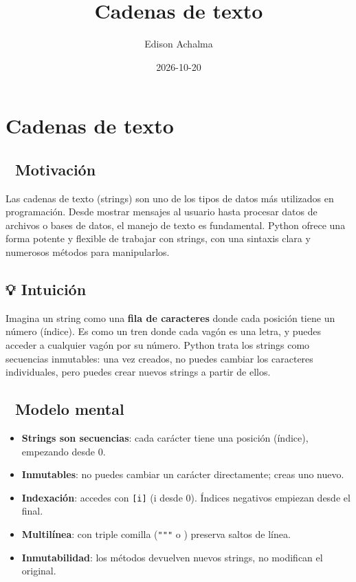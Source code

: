 \documentclass[
  doc,
  floatsintext,
  longtable,
  a4paper,
  nolmodern,
  notxfonts,
  notimes,
  12pt,
  colorlinks=true,linkcolor=blue,citecolor=blue,urlcolor=blue]{apa7}
\title{Cadenas de texto}
\author{Edison Achalma}
\affiliation{
{Escuela Profesional de Economía, Universidad Nacional de San Cristóbal
de Huamanga}}
\date{2026-10-20}
\providecommand{\tightlist}{%
  \setlength{\itemsep}{0pt}\setlength{\parskip}{0pt}}
\begin{document}
\maketitle


\hypertarget{toc}{}
\tableofcontents
\newpage
\section[Introduction]{Cadenas de texto}

\setcounter{secnumdepth}{3}

\setlength\LTleft{0pt}




\subsection{🎯 Motivación}\label{motivaciuxf3n}

Las cadenas de texto (strings) son uno de los tipos de datos más
utilizados en programación. Desde mostrar mensajes al usuario hasta
procesar datos de archivos o bases de datos, el manejo de texto es
fundamental. Python ofrece una forma potente y flexible de trabajar con
strings, con una sintaxis clara y numerosos métodos para manipularlos.

\subsection{💡 Intuición}\label{intuiciuxf3n}

Imagina un string como una \textbf{fila de caracteres} donde cada
posición tiene un número (índice). Es como un tren donde cada vagón es
una letra, y puedes acceder a cualquier vagón por su número. Python
trata los strings como secuencias inmutables: una vez creados, no puedes
cambiar los caracteres individuales, pero puedes crear nuevos strings a
partir de ellos.

\subsection{🧠 Modelo mental}\label{modelo-mental}

\begin{itemize}
\tightlist
\item
  \textbf{Strings son secuencias}: cada carácter tiene una posición
  (índice), empezando desde 0.
\item
  \textbf{Inmutables}: no puedes cambiar un carácter directamente; creas
  uno nuevo.
\item
  \textbf{Indexación}: accedes con \texttt{{[}i{]}} (i desde 0). Índices
  negativos empiezan desde el final.
\item
  \textbf{Multilínea}: con triple comilla (\texttt{"""} o
  \texttt{\textquotesingle{}\textquotesingle{}\textquotesingle{}})
  preserva saltos de línea.
\item
  \textbf{Inmutabilidad}: los métodos devuelven nuevos strings, no
  modifican el original.
\end{itemize}
\end{document}
